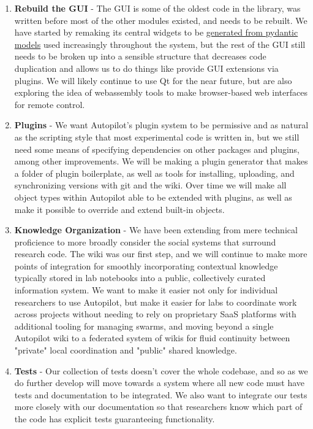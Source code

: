 \begin{enumerate}[ref=\thechapter.\arabic*]
    \item \label{future:gui} \textbf{Rebuild the GUI} - The GUI is some of the oldest code in the library, was written before most of the other modules existed, and needs to be rebuilt. We have started by remaking its central widgets to be \href{https://github.com/wehr-lab/autopilot/blob/f0d20fbf3b33f832cf31136ab7d16abe01a3e924/autopilot/gui/widgets/model.py}{generated from pydantic models} used increasingly throughout the system, but the rest of the GUI still needs to be broken up into a sensible structure that decreases code duplication and allows us to do things like provide GUI extensions via plugins. We will likely continue to use Qt for the near future, but are also exploring the idea of webassembly tools to make browser-based web interfaces for remote control.
    \item \label{future:plugins} \textbf{Plugins} - We want Autopilot's plugin system to be permissive and as natural as the scripting style that most experimental code is written in, but we still need some means of specifying dependencies on other packages and plugins, among other improvements. We will be making a plugin generator that makes a folder of plugin boilerplate, as well as tools for installing, uploading, and synchronizing versions with git and the wiki. Over time we will make all object types within Autopilot able to be extended with plugins, as well as make it possible to override and extend built-in objects.
    \item \label{future:knowledge} \textbf{Knowledge Organization} - We have been extending from mere technical proficience to more broadly consider the social systems that surround research code. The wiki was our first step, and we will continue to make more points of integration for smoothly incorporating contextual knowledge typically stored in lab notebooks into a public, collectively curated information system. We want to make it easier not only for individual researchers to use Autopilot, but make it easier for labs to coordinate work across projects without needing to rely on proprietary SaaS platforms with additional tooling for managing swarms, and moving beyond a single Autopilot wiki to a federated system of wikis for fluid continuity between "private" local coordination and "public" shared knowledge.
    \item \label{future:tests}\textbf{Tests} - Our collection of tests doesn't cover the whole codebase, and so as we do further develop will move towards a system where all new code must have tests and documentation to be integrated. We also want to integrate our tests more closely with our documentation so that researchers know which part of the code has explicit tests guaranteeing functionality.

\end{enumerate}
